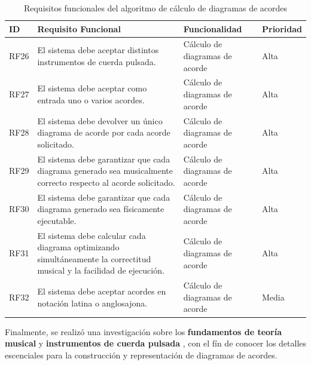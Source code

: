\begin{table}[H]
    \centering
    \scriptsize
    \begin{tabular}{l p{} p{} l}
        \textbf{ID} & \textbf{Requisito Funcional} & \textbf{Funcionalidad} & \textbf{Prioridad} \\ \hline

        RF26 & El sistema debe aceptar distintos instrumentos de cuerda pulsada. & Cálculo de diagramas de acorde & Alta \\ \hline

        RF27 & El sistema debe aceptar como entrada uno o varios acordes. & Cálculo de diagramas de acorde & Alta \\ \hline

        RF28 & El sistema debe devolver un único diagrama de acorde por cada acorde solicitado. & Cálculo de diagramas de acorde & Alta \\ \hline

        RF29 & El sistema debe garantizar que cada diagrama generado sea musicalmente correcto respecto al acorde solicitado. & Cálculo de diagramas de acorde & Alta \\ \hline

        RF30 & El sistema debe garantizar que cada diagrama generado sea físicamente ejecutable. & Cálculo de diagramas de acorde & Alta \\ \hline

        RF31 & El sistema debe calcular cada diagrama optimizando simultáneamente la correctitud musical y la facilidad de ejecución. & Cálculo de diagramas de acorde & Alta \\ \hline

        RF32 & El sistema debe aceptar acordes en notación latina o anglosajona. & Cálculo de diagramas de acorde & Media \\ \hline

    \end{tabular}
    \caption{Requisitos funcionales del algoritmo de cálculo de diagramas de acordes}
    \label{tab:requisitosfuncionalesincremento2}
\end{table}

Finalmente, se realizó una investigación sobre los \textbf{fundamentos de teoría musical}  y \textbf{instrumentos de cuerda pulsada} , con el fín de conocer los detalles escenciales para la construcción y representación de diagramas de acordes.